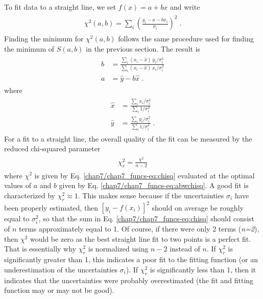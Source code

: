 \documentclass[letterpaper,10pt,english]{sphinxmanual}
\begin{document}
To fit data to a straight line, we set \(f(x) = a + bx\) and write
\label{chap7/chap7_funcs:equation-eq:chisqlin}\begin{gather}
\begin{split}\chi^2(a,b) = \sum_{i} \left(\frac{y_{i} - a -bx_{i}} {\sigma_{i}}\right)^2 \;.\end{split}\label{chap7/chap7_funcs-eq:chisqlin}
\end{gather}
Finding the minimum for \(\chi^2(a,b)\) follows the same procedure used for finding the minimum of \(S(a,b)\) in the previous section.  The result is
\label{chap7/chap7_funcs:equation-eq:abwchisq}\begin{gather}
\begin{split}b &= \frac{\sum_{i}(x_{i} - \hat{x})\,y_{i}/\sigma_{i}^2} {\sum_{i}(x_{i} - \hat{x})\,x_{i}/\sigma_{i}^2}\\
a &= \hat{y} - b\hat{x} \;.\end{split}\label{chap7/chap7_funcs-eq:abwchisq}
\end{gather}
where
\label{chap7/chap7_funcs:equation-eq:xychisq}\begin{gather}
\begin{split}\hat{x} &= \frac{\sum_{i}x_{i}/\sigma_{i}^2} {\sum_{i}1/\sigma_{i}^2}\\
\hat{y} &= \frac{\sum_{i}y_{i}/\sigma_{i}^2} {\sum_{i}1/\sigma_{i}^2}\;.\end{split}\label{chap7/chap7_funcs-eq:xychisq}
\end{gather}
For a fit to a straight line, the overall quality of the fit can be measured by the reduced chi-squared parameter
\label{chap7/chap7_funcs:equation-:eq:linreg13}\begin{gather}
\begin{split}\chi_{r}^2 = \frac{\chi^2}{n-2}\end{split}\label{chap7/chap7_funcs-:eq:linreg13}
\end{gather}
where \(\chi^2\) is given by Eq. \eqref{chap7/chap7_funcs-eq:chisq} evaluated at the optimal values of \(a\) and \(b\) given by Eq. \eqref{chap7/chap7_funcs-eq:abwchisq}.  A good fit is characterized by \(\chi_{r}^2 \approx 1\).  This makes sense because if the uncertainties \(\sigma_{i}\) have been properly estimated, then \([y_{i}-f(x_{i})]^2\) should on average be roughly equal to \(\sigma_{i}^2\), so that the sum in Eq. \eqref{chap7/chap7_funcs-eq:chisq} should consist of \(n\) terms approximately equal to 1.  Of course, if there were only 2 terms (\emph{n=2}), then \(\chi^2\) would be zero as the best straight line fit to two points is a perfect fit.  That is essentially why \(\chi_{r}^2\) is normalized using \(n-2\) instead of \(n\).  If \(\chi_{r}^2\) is significantly greater than 1, this indicates a poor fit to the fitting function (or an underestimation of the uncertainties \(\sigma_{i}\)).  If \(\chi_{r}^2\) is significantly less than 1, then it indicates that the uncertainties were probably overestimated (the fit and fitting function may or may not be good).
\end{document}
